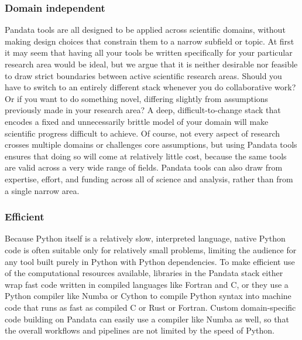 \subsubsection{Domain independent}
Pandata tools are all designed to be applied across scientific domains, without making design choices that constrain them to a narrow subfield or topic. At first it may seem that having all your tools be written specifically for your particular research area would be ideal, but we argue that it is neither desirable nor feasible to draw strict boundaries between active scientific research areas. Should you have to switch to an entirely different stack whenever you do collaborative work? Or if you want to do something novel, differing slightly from assumptions previously made in your research area? A deep, difficult-to-change stack that encodes a fixed and unnecessarily brittle model of your domain will make scientific progress difficult to achieve. Of course, not every aspect of research crosses multiple domains or challenges core assumptions, but using Pandata tools ensures that doing so will come at relatively little cost, because the same tools are valid across a very wide range of fields. Pandata tools can also draw from expertise, effort, and funding across all of science and analysis, rather than from a single narrow area.

\subsubsection{Efficient}
Because Python itself is a relatively slow, interpreted language, native Python code is often suitable only for relatively small problems, limiting the audience for any tool built purely in Python with Python dependencies. To make efficient use of the computational resources available, libraries in the Pandata stack either wrap fast code written in compiled languages like Fortran and C, or they use a Python compiler like Numba \cite{lam:llvm15} or Cython \cite{behnel:cse11} to compile Python syntax into machine code that runs as fast as compiled C or Rust or Fortran. Custom domain-specific code building on Pandata can easily use a compiler like Numba as well, so that the overall workflows and pipelines are not limited by the speed of Python.

